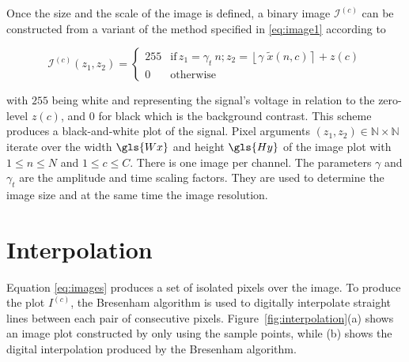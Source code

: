 Once the size and the scale of the image is defined,  a binary image $\mathcal{I}^{(c)}$ can be constructed from a variant of the method specified in \ref{eq:image1} according to

\begin{equation}
\mathcal{I}^{(c)}(z_1,z_2) = \left\{ \begin{array}{rl}
255 & \text{if} \,  z_1 = \gamma_{t} \  n; \! z_2 = \left\lfloor \gamma \; \tilde{x}(n,c) \right\rceil + z(c) \\
0   & \mbox{otherwise}
\end{array}\right.
\label{eq:images}
\end{equation}

\noindent with $255$ being white and representing the signal's voltage in relation to the zero-level $z(c)$, and $0$ for black which is the background contrast. This scheme produces a black-and-white plot of the signal.  Pixel arguments $ (z_1,z_2) \in \mathbb{N} \times \mathbb{N}$ iterate over the width $\gls{Wx}$ and height $\gls{Hy}$  of the image plot with $1 \leq n \leq N$ and $1 \leq c \leq C$.  There is one image per channel.  The parameters $\gamma$ and $\gamma_t$ are the amplitude and time scaling factors.  They are used to determine the image size and at the same time the image resolution.

\section{Interpolation}

Equation \ref{eq:images} produces a set of isolated pixels over the image.  To produce the plot $I^{(c)}$, the Bresenham \cite{Bresenham1965,Ramele2016} algorithm is used to digitally interpolate straight lines between each pair of consecutive pixels.  Figure~\ref{fig:interpolation}(a) shows an image plot constructed by only using the sample points, while (b) shows the digital interpolation produced by the Bresenham algorithm.

